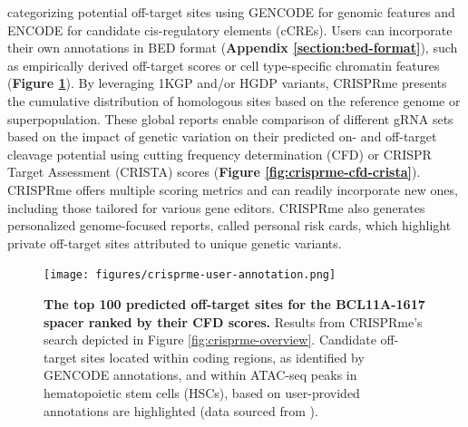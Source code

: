 \documentclass[a4paper, titlepage, openright]{book}
\newcommand{\crisprme}{CRISPRme\xspace}
\begin{document}
categorizing potential off-target sites using GENCODE \citep{frankish2019gencode} for genomic features and ENCODE \citep{encode2012integrated} for candidate cis-regulatory elements (cCREs). Users can incorporate their own annotations in BED format (\textbf{Appendix \ref{section:bed-format}}), such as empirically derived off-target scores or cell type-specific chromatin features (\textbf{Figure \ref{fig:crisprme-user-annotation}}). By leveraging 1KGP \citep{10002015global} and/or HGDP \citep{bergstrom2020insights} variants, \crisprme presents the cumulative distribution of homologous sites based on the reference genome or superpopulation. These global reports enable comparison of different gRNA sets based on the impact of genetic variation on their predicted on- and off-target cleavage potential using cutting frequency determination (CFD) \citep{doench2016optimized} or CRISPR Target Assessment (CRISTA) \citep{abadi2017machine} scores (\textbf{Figure \ref{fig:crisprme-cfd-crista}}). \crisprme offers multiple scoring metrics and can readily incorporate new ones, including those tailored for various gene editors. \crisprme also generates personalized genome-focused reports, called personal risk cards, which highlight private off-target sites attributed to unique genetic variants.

\begin{figure}[!]
    \centering
    \texttt{[image: figures/crisprme-user-annotation.png]}
    \caption[The top 100 predicted off-target sites for the BCL11A-1617 spacer ranked by their CFD scores]{\textbf{The top 100 predicted off-target sites for the BCL11A-1617 spacer ranked by their CFD scores.} Results from \crisprme's search depicted in Figure \ref{fig:crisprme-overview}. Candidate off-target sites located within coding regions, as identified by GENCODE annotations, and within ATAC-seq peaks in hematopoietic stem cells (HSCs), based on user-provided annotations  are highlighted (data sourced from \cite{corces2016lineage}).}
    \label{fig:crisprme-user-annotation}
\end{figure}
\end{document}
